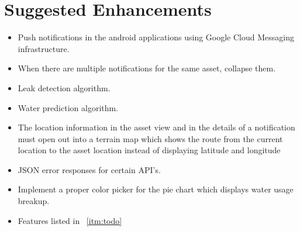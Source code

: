 \documentclass[11pt]{report} %
\begin{document}
\chapter{Suggested Enhancements}
\begin{itemize}
\item Push notifications in the android applications using Google Cloud Messaging infrastructure.
\item When there are multiple notifications for the same asset, collapse them.
\item Leak detection algorithm.
\item Water prediction algorithm.
\item The location information in the asset view and in the details of a notification must open out into a terrain map which shows the route from the current location to the asset location instead of displaying latitude and longitude
\item JSON error responses for certain API's.
\item Implement a proper color picker for the pie chart which displays water usage breakup.
\item Features listed in ~\ref{itm:todo}
\end{itemize}

\end{document}
